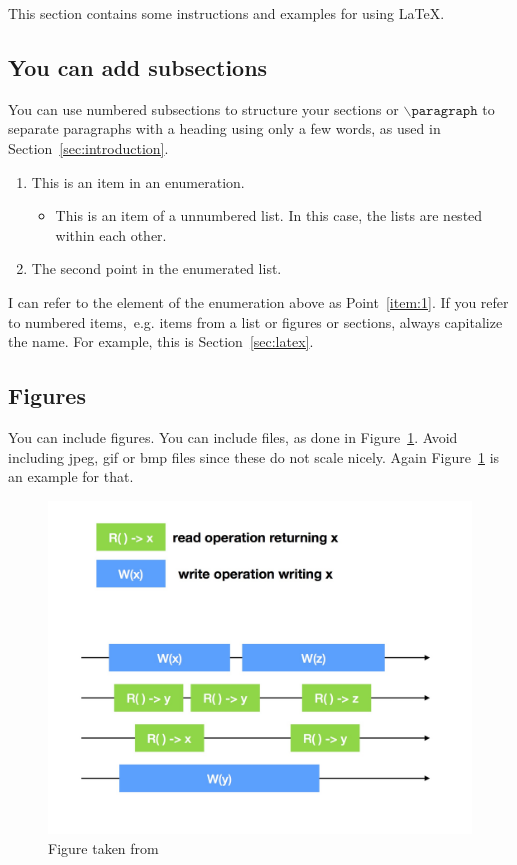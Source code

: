 This section contains some instructions and examples for using \LaTeX.

\subsection{You can add subsections}
You can use numbered subsections to structure your sections or $\backslash\texttt{paragraph}$ to separate paragraphs with a heading using only a few words, as used in Section~\ref{sec:introduction}.


\begin{enumerate}
	\item\label{item:1} This is an item in an enumeration.
    \begin{itemize}
    	\item This is an item of a unnumbered list. In this case, the lists are nested within each other.
    \end{itemize}
    \item\label{item:2} The second point in the enumerated list.
\end{enumerate}
%
I can refer to the element of the enumeration above as Point~\ref{item:1}.
If you refer to numbered items,~e.g. items from a list or figures or sections, always capitalize the name. 
For example, this is Section~\ref{sec:latex}.

\subsection{Figures}
You can include figures. You can include files, as done in Figure~\ref{fig:example}. 
Avoid including jpeg, gif or bmp files since these do not scale nicely. Again Figure~\ref{fig:example} is an example for that.

\begin{figure}[t]
   \centering
   \includegraphics[width=\linewidth]{fig/RegisterOperations}
    \caption{Figure taken from~\cite{lecture}}
    \label{fig:example}
\end{figure}

